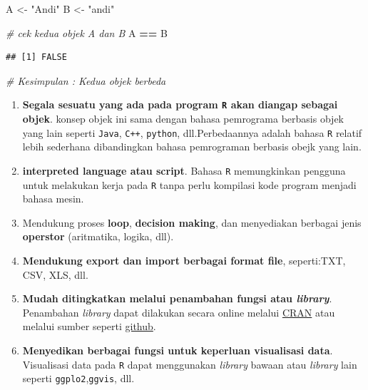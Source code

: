 \documentclass[]{book}
\newenvironment{Shaded}{\begin{snugshade}}{\end{snugshade}}
\newcommand{\CommentTok}[1]{\textcolor[rgb]{0.56,0.35,0.01}{\textit{#1}}}
\newcommand{\NormalTok}[1]{#1}
\newcommand{\OperatorTok}[1]{\textcolor[rgb]{0.81,0.36,0.00}{\textbf{#1}}}
\newcommand{\StringTok}[1]{\textcolor[rgb]{0.31,0.60,0.02}{#1}}
\providecommand{\tightlist}{%
  \setlength{\itemsep}{0pt}\setlength{\parskip}{0pt}}
\theoremstyle{definition}
\theoremstyle{definition}
\theoremstyle{definition}
\theoremstyle{remark}
\begin{document}
\begin{Shaded}
\begin{Highlighting}[]
\NormalTok{A <-}\StringTok{ "Andi"}
\NormalTok{B <-}\StringTok{ "andi"}

\CommentTok{# cek kedua objek A dan B}
\NormalTok{A }\OperatorTok{==}\StringTok{ }\NormalTok{B}
\end{Highlighting}
\end{Shaded}

\begin{verbatim}
## [1] FALSE
\end{verbatim}

\begin{Shaded}
\begin{Highlighting}[]
\CommentTok{# Kesimpulan : Kedua objek berbeda}
\end{Highlighting}
\end{Shaded}

\begin{enumerate}
\def\labelenumi{\arabic{enumi}.}
\setcounter{enumi}{1}
\tightlist
\item
  \textbf{Segala sesuatu yang ada pada program \texttt{R} akan diangap sebagai objek}. konsep objek ini sama dengan bahasa pemrograma berbasis objek yang lain seperti \texttt{Java}, \texttt{C++}, \texttt{python}, dll.Perbedaannya adalah bahasa \texttt{R} relatif lebih sederhana dibandingkan bahasa pemrograman berbasis obejk yang lain.
\item
  \textbf{interpreted language atau script}. Bahasa \texttt{R} memungkinkan pengguna untuk melakukan kerja pada \texttt{R} tanpa perlu kompilasi kode program menjadi bahasa mesin.
\item
  Mendukung proses \textbf{loop}, \textbf{decision making}, dan menyediakan berbagai jenis \textbf{operstor} (aritmatika, logika, dll).
\item
  \textbf{Mendukung export dan import berbagai format file}, seperti:TXT, CSV, XLS, dll.
\item
  \textbf{Mudah ditingkatkan melalui penambahan fungsi atau \emph{library}}. Penambahan \emph{library} dapat dilakukan secara online melalui \href{https://cran.r-project.org/}{CRAN} atau melalui sumber seperti \href{https://github.com/}{github}.
\item
  \textbf{Menyedikan berbagai fungsi untuk keperluan visualisasi data}. Visualisasi data pada \texttt{R} dapat menggunakan \emph{library} bawaan atau \emph{library} lain seperti \texttt{ggplo2},\texttt{ggvis}, dll.
\end{enumerate}
\end{document}
